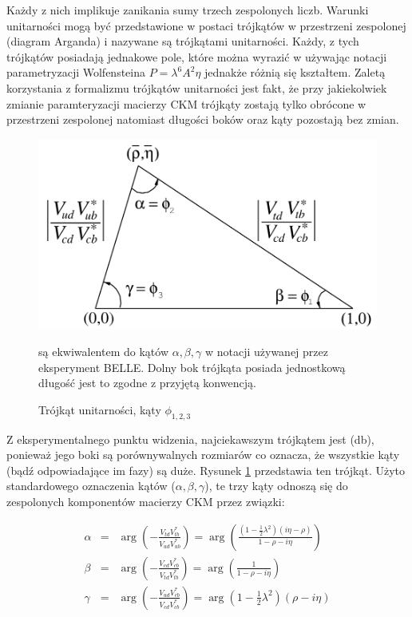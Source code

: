  Każdy z nich implikuje zanikania sumy trzech zespolonych liczb. Warunki unitarności mogą być przedstawione w postaci trójkątów w przestrzeni zespolonej (diagram Arganda) i nazywane są trójkątami unitarności. Każdy, z  tych trójkątów posiadają jednakowe pole, które można wyrazić w używając notacji parametryzacji Wolfensteina  $P=\lambda^6A^2 \eta$ jednakże różnią się kształtem. Zaletą korzystania z formalizmu trójkątów unitarności jest fakt, że przy jakiekolwiek zmianie paramteryzacji macierzy CKM trójkąty zostają tylko obrócone w przestrzeni zespolonej natomiast długości boków oraz kąty pozostają bez zmian. 
 
 \begin{figure}[ht]
 \centering
 \includegraphics[scale=0.3]{rozdzial1/trojkat.png}
 \caption{Trójkąt unitarności, kąty $ \phi_{1,2,3}$} są ekwiwalentem do kątów $\alpha,\beta,\gamma$ w notacji używanej przez eksperyment BELLE. Dolny bok trójkąta posiada jednostkową długość jest to zgodne z przyjętą konwencją. 
 \label{fig:trojkat db}
\end{figure}
 

Z eksperymentalnego punktu widzenia, najciekawszym trójkątem jest (db), ponieważ jego boki są porównywalnych rozmiarów co oznacza, że wszystkie kąty (bądź odpowiadające im fazy) są duże. Rysunek \ref{fig:trojkat db} przedstawia ten trójkąt. Użyto standardowego oznaczenia kątów ($\alpha , \beta , \gamma $), te trzy kąty odnoszą się do zespolonych komponentów macierzy CKM przez związki:

\begin{eqnarray}
\alpha &=& \arg \left(- \frac{V_{td}V^*_{tb}}{ V_{ud}V_{ub}^* }  \right) =\arg \left( \frac{(1-\frac{1}{2} \lambda^2)(i \eta -\rho )}{1-\rho -i\eta}  \right)\\
\beta &=& \arg \left(- \frac{V_{cd}V^*_{cb}}{ V_{td}V_{tb}^* }  \right) =\arg \left( \frac{1}{1-\rho -i\eta}  \right)\\
\gamma &=& \arg \left(- \frac{V_{ud}V^*_{cb}}{ V_{cd}V_{cb}^* }  \right) =\arg \left( 1-\frac{1}{2} \lambda^2 \right) \left( \rho -i \eta \right)
\end{eqnarray} 

